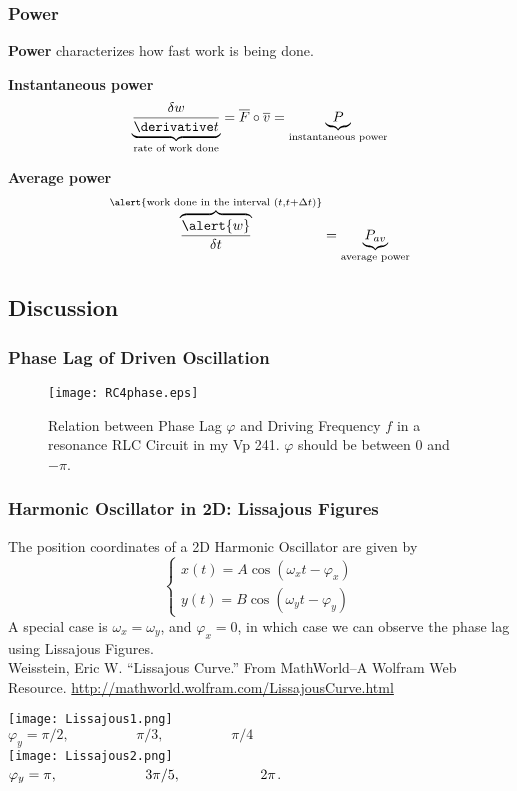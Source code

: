 \begin{frame}
\frametitle{Power}
\alert{\textbf{Power}} characterizes how \alert{fast} work is being done.
\begin{definition}
\alert{\textbf{Instantaneous power}}
\[\underbrace{\frac{\delta w}{\derivative t}}_{\text{rate of work done}}=\overline{F}\circ\overline{v}=\underbrace{P}_{\text{instantaneous power}}\]
\end{definition}
\begin{definition}
\alert{\textbf{Average power}}
\[\overbrace{\frac{\alert{w}}{\delta t}}^{\alert{\text{work done in the interval }(t,t+\Delta t)}}=\underbrace{P_{av}}_{\text{average power}}\]
\end{definition}
\end{frame}
\subsection{Discussion}
\begin{frame}
\frametitle{Phase Lag of Driven Oscillation}
\begin{figure}[H]
\centering
\texttt{[image: RC4phase.eps]}
\caption{Relation between Phase Lag $\varphi$ and Driving Frequency $f$ in a resonance RLC Circuit in my Vp 241. $\varphi$ should be between $0$ and $-\pi$.}
\end{figure}
\end{frame}
\begin{frame}
\frametitle{Harmonic Oscillator in 2D: Lissajous Figures}
The position coordinates of a \alert{2D Harmonic Oscillator} are given by\[\begin{cases}x(t)=A\cos(\omega_x t-\varphi_x)\\y(t)=B\cos(\omega_y t-\varphi_y)\end{cases}\]
A special case is $\omega_x=\omega_y$, and $\varphi_x=0$, in which case we can observe the \alert{phase lag} using \alert{Lissajous Figures}.\\
 Weisstein, Eric W. ``Lissajous Curve.'' From MathWorld--A Wolfram Web Resource. \url{http://mathworld.wolfram.com/LissajousCurve.html} 
\end{frame}
\begin{frame}
\texttt{[image: Lissajous1.png]}\\
$\varphi_y=\pi/2,\hspace{2cm} \pi/3,\hspace{2cm} \pi/4$\\
\texttt{[image: Lissajous2.png]}\\
$\varphi_y=\pi,\hspace{2.2cm} 3\pi/5,\hspace{2cm} 2\pi$.
\end{frame}
